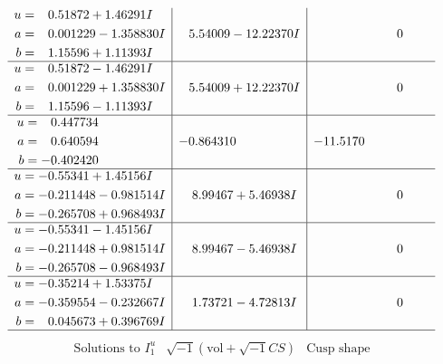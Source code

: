 \documentclass[1p]{elsarticle_modified}
\theoremstyle{definition}
\newcommand{\I}{\sqrt{-1}}
\begin{document}
$$\begin{array}{c|c|c}
\begin{aligned}
u &= \phantom{-}0.51872 + 1.46291 I \\
a &= \phantom{-}0.001229 - 1.358830 I \\
b &= \phantom{-}1.15596 + 1.11393 I\end{aligned}
 & \phantom{-}5.54009 - 12.22370 I & \phantom{-0.000000 } 0 \\ \hline\begin{aligned}
u &= \phantom{-}0.51872 - 1.46291 I \\
a &= \phantom{-}0.001229 + 1.358830 I \\
b &= \phantom{-}1.15596 - 1.11393 I\end{aligned}
 & \phantom{-}5.54009 + 12.22370 I & \phantom{-0.000000 } 0 \\ \hline\begin{aligned}
u &= \phantom{-}0.447734\phantom{ +0.000000I} \\
a &= \phantom{-}0.640594\phantom{ +0.000000I} \\
b &= -0.402420\phantom{ +0.000000I}\end{aligned}
 & -0.864310\phantom{ +0.000000I} & -11.5170\phantom{ +0.000000I} \\ \hline\begin{aligned}
u &= -0.55341 + 1.45156 I \\
a &= -0.211448 - 0.981514 I \\
b &= -0.265708 + 0.968493 I\end{aligned}
 & \phantom{-}8.99467 + 5.46938 I & \phantom{-0.000000 } 0 \\ \hline\begin{aligned}
u &= -0.55341 - 1.45156 I \\
a &= -0.211448 + 0.981514 I \\
b &= -0.265708 - 0.968493 I\end{aligned}
 & \phantom{-}8.99467 - 5.46938 I & \phantom{-0.000000 } 0 \\ \hline\begin{aligned}
u &= -0.35214 + 1.53375 I \\
a &= -0.359554 - 0.232667 I \\
b &= \phantom{-}0.045673 + 0.396769 I\end{aligned}
 & \phantom{-}1.73721 - 4.72813 I & \phantom{-0.000000 } 0\\
 \hline 
 \end{array}$$\newpage$$\begin{array}{c|c|c}  
\text{Solutions to }I^u_{1}& \I (\text{vol} + \sqrt{-1}CS) & \text{Cusp shape}\\

\end{array}$$
\end{document}
